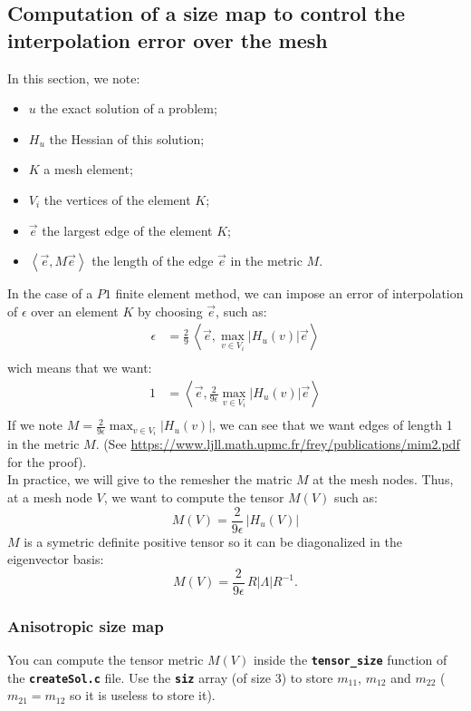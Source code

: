 \documentclass{article}
\newcommand{\ttb}[1]{\texttt{\textbf{#1}}}
\begin{document}
\subsection{Computation of a size map to control the interpolation error over the mesh}
In this section, we note:
\begin{itemize}
\item $u$ the exact solution of a problem;
\item $H_u$ the Hessian of this solution;
\item $K$ a mesh element;
\item $V_i$ the vertices of the element $K$;
\item $\vec{e}$ the largest edge of the element $K$;
\item $\left<\vec{e},M\vec{e}\right>$ the length of the edge $\vec{e}$ in the metric $M$.\\
\end{itemize}

In the case of a $P1$ finite element method, we can
impose an error of interpolation of $\epsilon$ over an element $K$ by
choosing $\vec{e}$, such as:
\begin{align*}
\epsilon &= \frac{2}{9} \, \left< \vec{e},\max_{v \in V_i} \left| H_u (v) \right| \vec{e} \right>\\
\end{align*}
wich means that we want:
\begin{align*}
1        &= \left< \vec{e},\frac{2}{9\epsilon}  \max_{v \in V_i} \left| H_u (v) \right| \vec{e} \right>\\
\end{align*}
If we note $M = \frac{2}{9\epsilon} \max_{v \in V_i} \left| H_u (v)
\right|$, we can see that we want edges of length 1 in the metric
$M$. (See
\url{https://www.ljll.math.upmc.fr/frey/publications/mim2.pdf} for the
proof).\\

In practice, we will give to the remesher the matric $M$ at the mesh nodes.
Thus, at a mesh node $V$, we want to compute the tensor $M(V)$ such
as:
$$
M(V) = \frac{2}{9\epsilon} \, \left | H_u(V) \right |
$$
$M$ is a symetric definite positive tensor so it can be diagonalized in the eigenvector basis:
$$
M(V) = \frac{2}{9\epsilon} \, R
\left |\Lambda\right | R^{-1}.
$$

\subsubsection{Anisotropic size map}
You can compute the tensor metric $M(V)$ inside the \ttb{tensor\_size}
function of the \ttb{createSol.c} file. Use the \ttb{siz} array (of
size 3) to store $m_{11}$, $m_{12}$ and $m_{22}$ ($m_{21} = m_{12}$ so
it is useless to store it).\\
\end{document}
